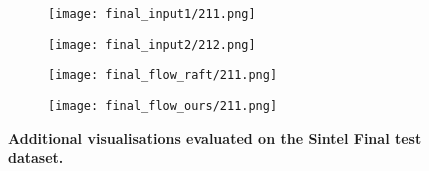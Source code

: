 \documentclass[10pt,twocolumn,letterpaper]{article}
\begin{document}
\begin{figure*}[ht!]
     
     \begin{subfigure}[b]{0.245\textwidth}
         \centering
         \texttt{[image: final\_input1/211.png]}
     \end{subfigure}\hfill
     \begin{subfigure}[b]{0.245\textwidth}
         \centering
         \texttt{[image: final\_input2/212.png]}
     \end{subfigure}\hfill
     \begin{subfigure}[b]{0.245\textwidth}
         \centering
         \texttt{[image: final\_flow\_raft/211.png]}
     \end{subfigure}\hfill
     \begin{subfigure}[b]{0.245\textwidth}
         \centering
         \texttt{[image: final\_flow\_ours/211.png]}
     \end{subfigure}

     \caption{\textbf{Additional visualisations evaluated on the Sintel Final test dataset.} }
    \label{Fig:vis_final}
\end{figure*} 
\end{document}
